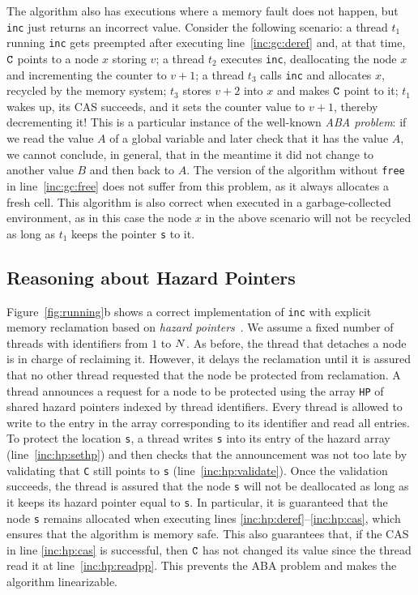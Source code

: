 The algorithm also has executions where a memory fault does not happen, but {\tt
  inc} just returns an incorrect value. Consider the following scenario: a
thread $t_1$ running \texttt{inc} gets preempted after executing
line~\ref{inc:gc:deref} and, at that time, $\texttt{C}$ points to a node $x$ storing
$v$; a thread $t_2$ executes \texttt{inc}, deallocating the node $x$
and incrementing the counter to $v+1$; a thread $t_3$ calls {\tt inc} and
allocates $x$, recycled by the memory system; $t_3$ stores $v+2$ into $x$ and
makes $\texttt{C}$ point to it; $t_1$ wakes up, its CAS succeeds, and it sets the
counter value to $v+1$, thereby decrementing it!
This is a particular instance of the well-known {\em ABA
  problem}: if we read the value $A$ of a global variable and later check
that it has the value $A$, we cannot conclude, in general, 
that in the meantime it did not change to another value $B$ and then back to $A$.  
The version of the algorithm without {\tt free} in line~\ref{inc:gc:free} does
not suffer from this problem, as it always allocates a fresh cell. 
This algorithm is also correct when executed in a
garbage-collected environment, as in this case the node $x$ in the above
scenario will not be recycled as long as $t_1$ keeps the pointer {\tt s}
to it.


\subsection{Reasoning about Hazard Pointers}

Figure~\ref{fig:running}b shows a correct implementation of {\tt inc} with
explicit memory reclamation based on {\em hazard pointers}~\cite{hazard}. We
assume a fixed number of threads with identifiers from $1$ to $N$. As
before, the thread that detaches a node is in charge of reclaiming it.  However,
it delays the reclamation until it is assured that no other thread requested
that the node be protected from reclamation. A thread announces a request for a
node to be protected using the array \texttt{HP} of shared hazard pointers
indexed by thread identifiers.  Every thread is allowed to write to the entry in
the array corresponding to its identifier and read all entries. To protect
the location {\tt s}, a thread writes {\tt s} into its entry of the hazard array
(line~\ref{inc:hp:sethp}) and then checks that the announcement was not too late
by validating that \texttt{C} still points to {\tt s}
(line~\ref{inc:hp:validate}).  Once the validation succeeds, the thread is
assured that the node {\tt s} will not be deallocated as long as it keeps its
hazard pointer equal to {\tt s}. In particular, it is guaranteed that
the node {\tt s} remains allocated when executing lines
\ref{inc:hp:deref}--\ref{inc:hp:cas}, which ensures that the algorithm is memory
safe.  This also guarantees that, if the CAS in line \ref{inc:hp:cas} is
successful, then $\texttt{C}$ has not changed its value since the thread read it at
line~\ref{inc:hp:readpp}. This prevents the ABA problem and makes the algorithm
linearizable.

